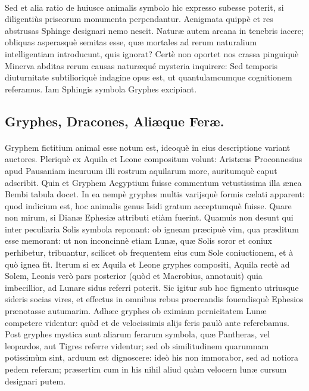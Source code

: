 \documentclass[a4paper, 11pt, oneside, polutonikogreek, latin]{article}
\begin{document}
\paragraph{}
Sed et alia ratio de huiusce animalis symbolo hìc expresso subesse poterit, si diligentiùs priscorum monumenta perpendantur. Aenigmata quippè et res abstrusas Sphinge designari nemo nescit. Naturæ autem arcana in tenebris iacere; obliquas asperasquè semitas esse, quæ mortales ad rerum naturalium intelligentiam introducunt, quis ignorat? Certè non oportet nos crassa pinguiquè Minerva abditas rerum causas naturæqué mysteria inquirere: Sed temporis diuturnitate subtilioriquè indagine opus est, ut quantulamcumque cognitionem referamus. Iam Sphingis symbola Gryphes excipiant.
\clearpage
\subsection{Gryphes, Dracones, Aliæque Feræ.}
\paragraph{}
Gryphem fictitium animal esse notum est, ideoquè in eius descriptione variant auctores. Pleriquè ex Aquila et Leone compositum volunt: Aristæus Proconnesius apud Pausaniam incuruum illi rostrum aquilarum more, auritumquè caput adscribit. Quin et Gryphem Aegyptium fuisse commentum vetustissima illa ænea Bembi tabula docet. In ea nempè gryphes multis varijsquè formis cælati apparent: quod indicium est, hoc animalis genus Isidi gratum acceptumquè fuisse. Quare non mirum, si Dianæ Ephesiæ attributi etiàm fuerint. Quamuìs non desunt qui inter peculiaria Solis symbola reponant: ob igneam præcipuè vim, qua præditum esse memorant: ut non inconcinnè etiam Lunæ, quæ Solis soror et coniux perhibetur, tribuantur, scilicet ob frequentem eius cum Sole coniuctionem, et à quò ignea fit. Iterum si ex Aquila et Leone gryphes compositi, Aquila rectè ad Solem, Leonis verò pars posterior (quòd et Macrobius, annotauit) quia imbecillior, ad Lunare sidus referri poterit. Sic igitur sub hoc figmento utriusque sideris socias vires, et effectus in omnibus rebus procreandis fouendisquè Ephesios prænotasse autumarim. Adhæc gryphes ob eximiam pernicitatem Lunæ competere videntur: quòd et de velocissimis alijs feris paulò ante referebamus. Post gryphes mystica sunt aliarum ferarum symbola, quæ Pantheras, vel leopardos, aut Tigres referre videntur; sed ob similitudinem quarumnam potissimùm sint, arduum est dignoscere: ideò his non immorabor, sed ad notiora pedem referam; præsertim cum in his nihil aliud quàm velocern lunæ cursum designari putem.
\clearpage
\end{document}
